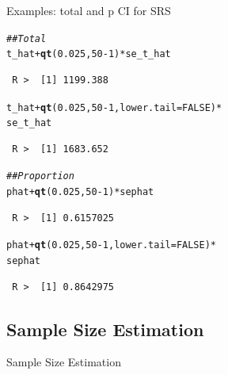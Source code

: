 \documentclass[10pt]{beamer}\usepackage[]{graphicx}\usepackage[]{xcolor}
\makeatletter
\newcommand{\hlnum}[1]{\textcolor[rgb]{0.686,0.059,0.569}{#1}}%
\newcommand{\hlcom}[1]{\textcolor[rgb]{0.678,0.584,0.686}{\textit{#1}}}%
\newcommand{\hlopt}[1]{\textcolor[rgb]{0,0,0}{#1}}%
\newcommand{\hlstd}[1]{\textcolor[rgb]{0.345,0.345,0.345}{#1}}%
\newcommand{\hlkwc}[1]{\textcolor[rgb]{0.333,0.667,0.333}{#1}}%
\newcommand{\hlkwd}[1]{\textcolor[rgb]{0.737,0.353,0.396}{\textbf{#1}}}%
\newenvironment{kframe}{%
 \def\at@end@of@kframe{}%
 \ifinner\ifhmode%
  \def\at@end@of@kframe{\end{minipage}}%
  \begin{minipage}{\columnwidth}%
 \fi\fi%
 \def\FrameCommand##1{\hskip\@totalleftmargin \hskip-\fboxsep
 \colorbox{shadecolor}{##1}\hskip-\fboxsep
     \hskip-\linewidth \hskip-\@totalleftmargin \hskip\columnwidth}%
 \MakeFramed {\advance\hsize-\width
   \@totalleftmargin\z@ \linewidth\hsize
   \@setminipage}}%
 {\par\unskip\endMakeFramed%
 \at@end@of@kframe}
\newenvironment{knitrout}{}{} %
\makeatother
\begin{document}
\begin{frame}[containsverbatim]{Examples: total and p CI for SRS}
\small
\begin{knitrout}
\color{fgcolor}\begin{kframe}
\begin{alltt}
\hlcom{## Total}
\hlstd{t_hat} \hlopt{+} \hlkwd{qt}\hlstd{(}\hlnum{0.025}\hlstd{,} \hlnum{50} \hlopt{-} \hlnum{1}\hlstd{)} \hlopt{*} \hlstd{se_t_hat}
\end{alltt}
\begin{verbatim}
 R >  [1] 1199.388
\end{verbatim}
\begin{alltt}
\hlstd{t_hat} \hlopt{+} \hlkwd{qt}\hlstd{(}\hlnum{0.025}\hlstd{,} \hlnum{50} \hlopt{-} \hlnum{1}\hlstd{,} \hlkwc{lower.tail} \hlstd{=} \hlnum{FALSE}\hlstd{)} \hlopt{*}
    \hlstd{se_t_hat}
\end{alltt}
\begin{verbatim}
 R >  [1] 1683.652
\end{verbatim}
\begin{alltt}
\hlcom{## Proportion}
\hlstd{phat} \hlopt{+} \hlkwd{qt}\hlstd{(}\hlnum{0.025}\hlstd{,} \hlnum{50} \hlopt{-} \hlnum{1}\hlstd{)} \hlopt{*} \hlstd{sephat}
\end{alltt}
\begin{verbatim}
 R >  [1] 0.6157025
\end{verbatim}
\begin{alltt}
\hlstd{phat} \hlopt{+} \hlkwd{qt}\hlstd{(}\hlnum{0.025}\hlstd{,} \hlnum{50} \hlopt{-} \hlnum{1}\hlstd{,} \hlkwc{lower.tail} \hlstd{=} \hlnum{FALSE}\hlstd{)} \hlopt{*}
    \hlstd{sephat}
\end{alltt}
\begin{verbatim}
 R >  [1] 0.8642975
\end{verbatim}
\end{kframe}
\end{knitrout}
\end{frame}

\subsection{Sample Size Estimation}

\begin{frame}{}
\begin{block}{}
Sample Size Estimation
\end{block}
\end{frame}
\end{document}
